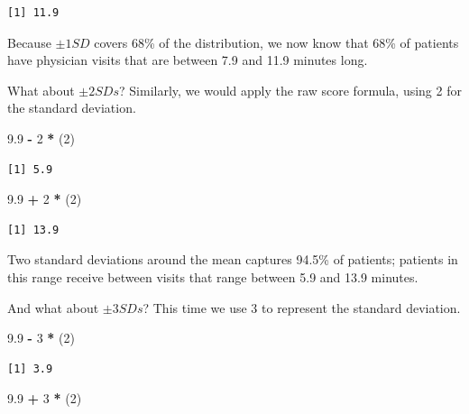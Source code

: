 \documentclass[
  11pt,
]{book}
\newenvironment{Shaded}{\begin{snugshade}}{\end{snugshade}}
\newcommand{\DecValTok}[1]{\textcolor[rgb]{0.06,0.06,0.06}{#1}}
\newcommand{\FloatTok}[1]{\textcolor[rgb]{0.06,0.06,0.06}{#1}}
\newcommand{\NormalTok}[1]{#1}
\newcommand{\SpecialCharTok}[1]{\textcolor[rgb]{0.43,0.43,0.43}{\textbf{#1}}}
\begin{document}
\begin{verbatim}
[1] 11.9
\end{verbatim}

Because \(\pm 1SD\) covers 68\% of the distribution, we now know that 68\% of patients have physician visits that are between 7.9 and 11.9 minutes long.

What about \(\pm 2SDs\)? Similarly, we would apply the raw score formula, using 2 for the standard deviation.

\begin{Shaded}
\begin{Highlighting}[]
\FloatTok{9.9} \SpecialCharTok{{-}} \DecValTok{2} \SpecialCharTok{*}\NormalTok{ (}\DecValTok{2}\NormalTok{)}
\end{Highlighting}
\end{Shaded}

\begin{verbatim}
[1] 5.9
\end{verbatim}

\begin{Shaded}
\begin{Highlighting}[]
\FloatTok{9.9} \SpecialCharTok{+} \DecValTok{2} \SpecialCharTok{*}\NormalTok{ (}\DecValTok{2}\NormalTok{)}
\end{Highlighting}
\end{Shaded}

\begin{verbatim}
[1] 13.9
\end{verbatim}

Two standard deviations around the mean captures 94.5\% of patients; patients in this range receive between visits that range between 5.9 and 13.9 minutes.

And what about \(\pm 3SDs\)? This time we use 3 to represent the standard deviation.

\begin{Shaded}
\begin{Highlighting}[]
\FloatTok{9.9} \SpecialCharTok{{-}} \DecValTok{3} \SpecialCharTok{*}\NormalTok{ (}\DecValTok{2}\NormalTok{)}
\end{Highlighting}
\end{Shaded}

\begin{verbatim}
[1] 3.9
\end{verbatim}

\begin{Shaded}
\begin{Highlighting}[]
\FloatTok{9.9} \SpecialCharTok{+} \DecValTok{3} \SpecialCharTok{*}\NormalTok{ (}\DecValTok{2}\NormalTok{)}
\end{Highlighting}
\end{Shaded}
\end{document}
